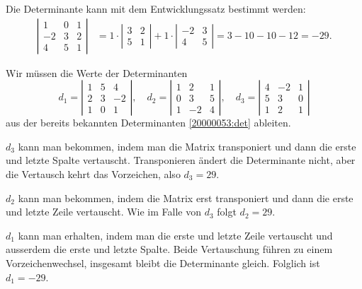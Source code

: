 \begin{loesung}
\begin{teilaufgaben}
\item
Die Determinante kann mit dem Entwicklungssatz bestimmt werden:
\begin{align}
\left|\begin{matrix}
 1&0&1\\
-2&3&2\\
 4&5&1
\end{matrix}\right|
&=
1\cdot\left|\begin{matrix}3&2\\5&1\end{matrix}\right|
+
1\cdot\left|\begin{matrix}-2&3\\4&5\end{matrix}\right|
=
3-10 -10-12
=
-29.
\label{20000053:det}
\end{align}
\item
Wir müssen die Werte der Determinanten
\[
d_1
=
\left|\begin{matrix}
1&5& 4\\
2&3&-2\\
1&0& 1
\end{matrix}\right|,
\quad
d_2
=
\left|\begin{matrix}
1& 2&1\\
0& 3&5\\
1&-2&4
\end{matrix}\right|,
\quad
d_3
=
\left|\begin{matrix}
4&-2&1\\
5& 3&0\\
1& 2&1
\end{matrix}\right|
\]
aus der bereits bekannten Determinanten \eqref{20000053:det} ableiten.

$d_3$ kann man bekommen, indem man die Matrix transponiert und
dann die erste und letzte Spalte vertauscht. 
Transponieren ändert die Determinante nicht, aber die Vertausch
kehrt das Vorzeichen, also $d_3=29$.

$d_2$ kann man bekommen, indem die Matrix erst transponiert und dann
die erste und letzte Zeile vertauscht.
Wie im Falle von $d_3$ folgt $d_2=29$.

$d_1$ kann man erhalten, indem man die erste und letzte Zeile vertauscht
und ausserdem die erste und letzte Spalte.
Beide Vertauschung führen zu einem Vorzeichenwechsel, insgesamt bleibt
die Determinante gleich. 
Folglich ist $d_1=-29$.
\qedhere
\end{teilaufgaben}
\end{loesung}

